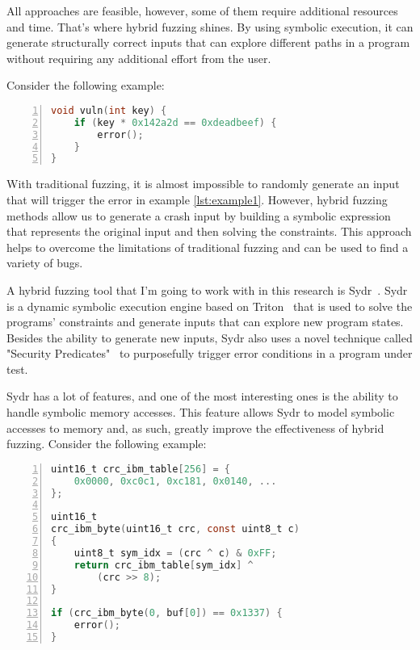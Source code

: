 \documentclass[conference]{IEEEtran}
\begin{document}
All approaches are feasible, however, some of them require additional resources and time. That's where hybrid fuzzing shines. By using symbolic execution, it can generate structurally correct inputs that can explore different paths in a program without requiring any additional effort from the user.

Consider the following example:

\begin{lstlisting}[caption={Example solvable by hybrid fuzzing},label={lst:example1},language=C, basicstyle=\small\ttfamily, numbers=left, xleftmargin=2em, breaklines=true, captionpos=b]
void vuln(int key) {
    if (key * 0x142a2d == 0xdeadbeef) {
        error();
    }
}
\end{lstlisting}


With traditional fuzzing, it is almost impossible to randomly generate an input that will trigger the error in example \ref{lst:example1}. However, hybrid fuzzing methods allow us to generate a crash input by building a symbolic expression that represents the original input and then solving the constraints. This approach helps to overcome the limitations of traditional fuzzing and can be used to find a variety of bugs.

A hybrid fuzzing tool that I'm going to work with in this research is Sydr~\cite{sydr-cutting-edge-dynamic-symbolic-execution}. Sydr is a dynamic symbolic execution engine based on Triton~\cite{saudel15} that is used to solve the programs' constraints and generate inputs that can explore new program states. Besides the ability to generate new inputs, Sydr also uses a novel technique called {"Security Predicates"}~\cite{symbolic-security-predicates} to purposefully trigger error conditions in a program under test.

Sydr has a lot of features, and one of the most interesting ones is the ability to handle symbolic memory accesses. This feature allows Sydr to model symbolic accesses to memory and, as such, greatly improve the effectiveness of hybrid fuzzing. Consider the following example:

\begin{lstlisting}[caption={Access to memory via a symbolic pointer},label={lst:example2},language=C, basicstyle=\small\ttfamily, numbers=left, xleftmargin=2em, breaklines=true, captionpos=b]
uint16_t crc_ibm_table[256] = { 
    0x0000, 0xc0c1, 0xc181, 0x0140, ...
};

uint16_t
crc_ibm_byte(uint16_t crc, const uint8_t c)
{
    uint8_t sym_idx = (crc ^ c) & 0xFF;
    return crc_ibm_table[sym_idx] ^ 
        (crc >> 8);
}

if (crc_ibm_byte(0, buf[0]) == 0x1337) {
    error();
}
\end{lstlisting}
\end{document}

